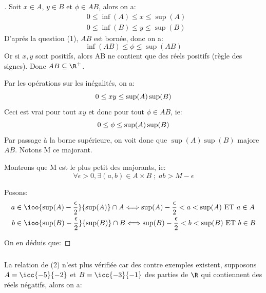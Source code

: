 \subsubsection*{}

\begin{proof}[\unskip\nopunct]
Soit \(x \in A\), \(y \in B\) et \(\phi \in AB\), alors on a:
\begin{align*}
   &0 \leq \inf(A) \leq x \leq \sup(A) \\
   &0 \leq \inf(B) \leq y \leq \sup(B)
\end{align*}
D'aprés la question (1), \(AB\) est bornée, donc on a:
\[
   \inf(AB) \leq \phi \leq \sup(AB)
\]
Or si \(x, y\) sont positifs, alors AB ne contient que des réels positifs (règle des signes). Donc \(AB \subseteq \R^+\).

Par les opérations sur les inégalités, on a:
\[
   0 \leq xy \leq \sup(A)\sup(B)\\
\]
Ceci est vrai pour tout \(xy\) et donc pour tout \(\phi \in AB\), ie:
\[
   0 \leq \phi \leq \sup(A)\sup(B)\\
\]
Par passage à la borne supérieure, on voit donc que \(\sup(A)\sup(B)\) majore \(AB\). Notons M ce majorant.\<

Montrons que M est le plus petit des majorants, ie:
\[
   \forall \epsilon > 0, \exists (a, b) \in A \times B \; ; \; ab > M - \epsilon
\]

Posons:
\begin{alignat*}{2}
   a &\in \ioo{\sup(A) - \frac{\epsilon}{2}}{\sup(A)} \cap A \Longleftrightarrow \sup(A) - \frac{\epsilon}{2} < a < \sup(A) \text{ ET } a \in A\\
   b &\in \ioo{\sup(B) - \frac{\epsilon}{2}}{\sup(B)} \cap B \Longleftrightarrow \sup(B) - \frac{\epsilon}{2} < b < \sup(B) \text{ ET } b \in B
\end{alignat*}

On en déduis que:

\end{proof}
\subsubsection*{}
La relation de (2) n'est plus vérifiée car des contre exemples existent, supposons \(A = \icc{-5}{-2}\) et \(B = \icc{-3}{-1}\) des parties de \(\R\) qui contiennent des réels négatifs, alors on a:

